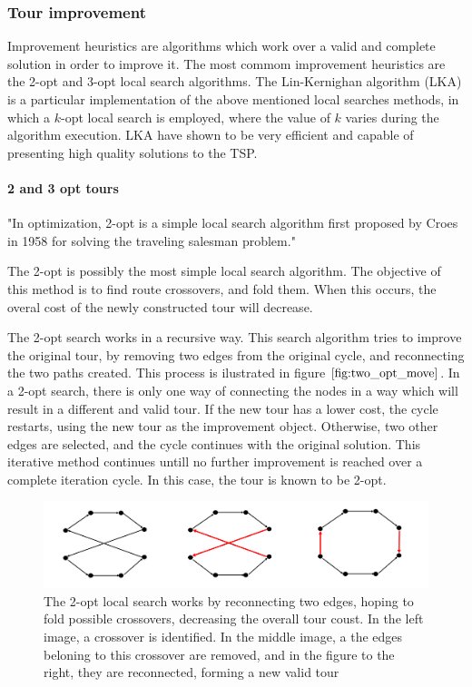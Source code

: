 \subsubsection{Tour improvement}

Improvement heuristics are algorithms which work over a valid and complete solution
in order to improve it.
The most commom improvement heuristics are the 2-opt and 3-opt
local search algorithms.
The Lin-Kernighan algorithm (LKA) is a particular implementation of the
above mentioned local searches methods, in which a $k$-opt local search is employed,
where the value of $k$ varies during the algorithm execution.
LKA have shown to be very efficient and capable of presenting high quality solutions to the TSP.


\paragraph{2 and 3 opt tours}
"In optimization, 2-opt is a simple local search algorithm first proposed
by Croes in 1958 for solving the traveling salesman problem."

The 2-opt is possibly the most simple local search algorithm. The objective
of this method is to find route crossovers, and fold them. When this occurs,
the overal cost of the newly constructed tour will decrease.

The 2-opt search works in a recursive way.
This search algorithm tries to improve the original tour, by removing two
edges from the original cycle, and reconnecting the two paths created.
This process is ilustrated in figure $\ref{fig:two_opt_move}$.
In a 2-opt search, there is only one way of connecting the nodes in a way
which will result in a different and valid tour.
If the new tour has a lower cost, the cycle restarts, using the new tour
as the improvement object.
Otherwise, two other edges are selected, and the cycle continues with
the original solution.
This iterative method continues untill no further improvement is reached
over a complete iteration cycle. In this case, the tour is known to be 2-opt.

\begin{figure}[htpb]
  \includegraphics[scale=0.3]{./Figures/tsp/2-opt-explained}
  \caption{The 2-opt local search works by reconnecting two edges, hoping to
  fold possible crossovers, decreasing the overall tour coust. In the left image,
  a crossover is identified. In the middle image, a the edges beloning to this crossover
  are removed, and in the figure to the right, they are reconnected, forming a new valid tour}
  \label{fig:two_opt_move}
\end{figure}

